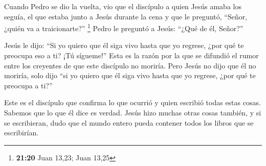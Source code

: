  Cuando Pedro se dio la vuelta, vio que el discípulo a
quien Jesús amaba los seguía, el que estaba junto a Jesús durante la
cena y que le preguntó, ``Señor, ¿quién va a traicionarte?'' \footnote{\textbf{21:20}
  Juan 13,23; Juan 13,25}  Pedro le preguntó a Jesús:
``¿Qué de él, Señor?''

 Jesús le dijo: ``Si yo quiero que él siga vivo hasta que
yo regrese, ¿por qué te preocupa eso a ti? ¡Tú sígueme!''
 Esta es la razón por la que se difundió el rumor entre
los creyentes de que este discípulo no moriría. Pero Jesús no dijo que
él no moriría, solo dijo ``si yo quiero que él siga vivo hasta que yo
regrese, ¿por qué te preocupa a ti?''

 Este es el discípulo que confirma lo que ocurrió y quien
escribió todas estas cosas. Sabemos que lo que él dice es verdad.
 Jesús hizo muchas otras cosas también, y si se
escribieran, dudo que el mundo entero pueda contener todos los libros
que se escribirían.
